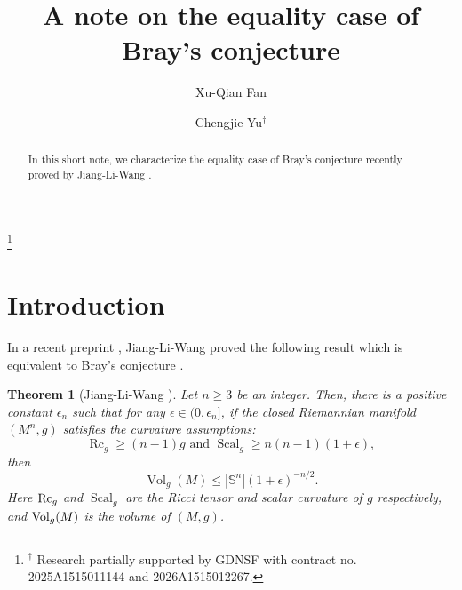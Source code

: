 \documentclass[12pt]{amsart}
\def\Rc{\mbox{Rc}}
\def\Vol{{\rm Vol}}
\def\e{\epsilon}
\def\Rc{{\rm Rc}}
\newtheorem{thm}{Theorem}[section]
\theoremstyle{definition}
\theoremstyle{remark}
\numberwithin{equation}{section}
\begin{document}
\title{A note on the equality case of Bray's conjecture}

\author{Xu-Qian Fan}
\address{Department of Mathematics, Jinan University, Guangzhou, 510632, China}
\author{Chengjie Yu$^\dagger$}
\address{Department of Mathematics, Shantou University, Shantou, Guangdong, 515063, China}
\thanks{$^\dagger$ Research partially supported by GDNSF with contract no. 2025A1515011144 and 2026A1515012267.}
\renewcommand{\subjclassname}{%
  \textup{2020} Mathematics Subject Classification}
\date{}
\begin{abstract}
In this short note, we characterize the equality case of Bray's conjecture recently proved by Jiang-Li-Wang \cite{JLW}.
\end{abstract}
\maketitle
{}
\section{Introduction}
In a recent preprint \cite{JLW}, Jiang-Li-Wang \cite{JLW} proved the following result which is equivalent to Bray's conjecture \cite{Br}.

\begin{thm}[Jiang-Li-Wang \cite{JLW}]\label{thm-JLW}
Let $n\geq 3$ be an integer. Then, there is a positive constant $\e_n$ such that for any $\e\in (0,\e_n]$, 
if the closed Riemannian manifold $(M^n,g)$ satisfies the curvature assumptions:
\[
\operatorname{Rc}_g \ge (n-1)g \mbox{ and } \operatorname{Scal}_g \ge n(n-1)(1+\epsilon),
\]
 then
\[
\operatorname{Vol}_g(M) \leq  |\mathbb{S}^n| (1+\epsilon)^{-n/2}.
\]
Here $\Rc_g$ and $\operatorname{Scal}_g$ are the Ricci tensor and scalar curvature of $g$ respectively, and $\Vol_g(M)$ is the volume of $(M,g)$. 
\end{thm}
\end{document}
